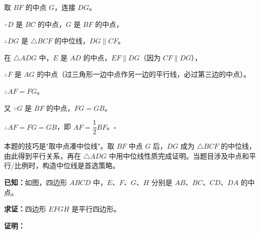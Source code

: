 \documentclass[12pt, a4paper]{ctexart}
\begin{document}
\begin{center}
\end{center}

取 \(BF\) 的中点 \(G\)，连接 \(DG\)。

\(\because D\) 是 \(BC\) 的中点，\(G\) 是 \(BF\) 的中点，

\(\therefore DG\) 是 \(\triangle BCF\) 的中位线，\(DG \parallel CF\)。

在 \(\triangle ADG\) 中，\(E\) 是 \(AD\) 的中点，\(EF \parallel DG\)（因为 \(CF \parallel DG\)），

\(\therefore F\) 是 \(AG\) 的中点（过三角形一边中点作另一边的平行线，必过第三边的中点）。

\(\therefore AF = FG\)。

又 \(\because G\) 是 \(BF\) 的中点，\(FG = GB\)。

\(\therefore AF = FG = GB\)，即 \(AF = \dfrac{1}{2}BF\)。\hfill\(\square\)

\begin{tipbox}[思路点拨]
本题的技巧是"取中点凑中位线"。取 \(BF\) 中点 \(G\) 后，\(DG\) 成为 \(\triangle BCF\) 的中位线，由此得到平行关系，再在 \(\triangle ADG\) 中用中位线性质完成证明。当题目涉及中点和平行/比例时，构造中位线是首选策略。
\end{tipbox}

\begin{examplebox}[【例题 4-2】中点四边形]
\textbf{已知：}如图，四边形 \(ABCD\) 中，\(E\)、\(F\)、\(G\)、\(H\) 分别是 \(AB\)、\(BC\)、\(CD\)、\(DA\) 的中点。

\textbf{求证：}四边形 \(EFGH\) 是平行四边形。
\end{examplebox}

\noindent\textbf{证明：}
\end{document}
